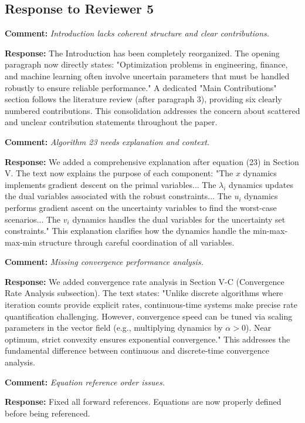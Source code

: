 \documentclass[journal,twoside,web]{ieeecolor}
\begin{document}
\subsection*{Response to Reviewer 5}

\textbf{Comment:} \textit{Introduction lacks coherent structure and clear contributions.}

\textbf{Response:} The Introduction has been completely reorganized. The opening paragraph now directly states: "Optimization problems in engineering, finance, and machine learning often involve uncertain parameters that must be handled robustly to ensure reliable performance." A dedicated "Main Contributions" section follows the literature review (after paragraph 3), providing six clearly numbered contributions. This consolidation addresses the concern about scattered and unclear contribution statements throughout the paper.

\textbf{Comment:} \textit{Algorithm 23 needs explanation and context.}

\textbf{Response:} We added a comprehensive explanation after equation (23) in Section V. The text now explains the purpose of each component: "The $x$ dynamics implements gradient descent on the primal variables... The $\lambda_i$ dynamics updates the dual variables associated with the robust constraints... The $u_i$ dynamics performs gradient ascent on the uncertainty variables to find the worst-case scenarios... The $v_i$ dynamics handles the dual variables for the uncertainty set constraints." This explanation clarifies how the dynamics handle the min-max-max-min structure through careful coordination of all variables.

\textbf{Comment:} \textit{Missing convergence performance analysis.}

\textbf{Response:} We added convergence rate analysis in Section V-C (Convergence Rate Analysis subsection). The text states: "Unlike discrete algorithms where iteration counts provide explicit rates, continuous-time systems make precise rate quantification challenging. However, convergence speed can be tuned via scaling parameters in the vector field (e.g., multiplying dynamics by $\alpha > 0$). Near optimum, strict convexity ensures exponential convergence." This addresses the fundamental difference between continuous and discrete-time convergence analysis.

\textbf{Comment:} \textit{Equation reference order issues.}

\textbf{Response:} Fixed all forward references. Equations are now properly defined before being referenced.
\end{document}
